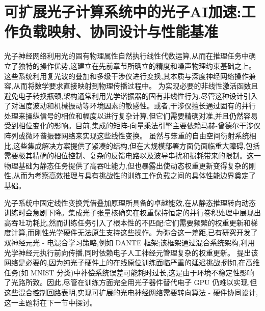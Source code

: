 \documentclass[11pt]{article}
\begin{document}
\section{可扩展光子计算系统中的光子AI加速:工作负载映射、协同设计与性能基准}\label{ux53efux6269ux5c55ux5149ux5b50ux8ba1ux7b97ux7cfbux7edfux4e2dux7684ux5149ux5b50aiux52a0ux901fux5de5ux4f5cux8d1fux8f7dux6620ux5c04ux534fux540cux8bbeux8ba1ux4e0eux6027ux80fdux57faux51c6}

光子神经网络利用光的固有物理属性自然执行线性代数运算,从而在推理任务中确立了独特的操作优势,这建立在先前章节所确立的精度和噪声物理约束基础之上。这些系统利用复光波的叠加和多级干涉仪进行变换,其本质与深度神经网络操作兼容,从而将数学要求直接映射到物理传播过程中。\citep{doi_10_1007_s11075_025_02218_2_e396aae0} \citep{doi_10_48550_arxiv_2510_03186_c4d4955e} 为实现必要的非线性激活函数且避免电子转换瓶颈,架构通常利用光学谐振器的固有非线性行为,尽管这种设计引入了对温度波动和机械振动等环境因素的敏感性。或者,干涉仪擅长通过固有的并行处理来操纵信号的相位和幅度以进行复杂计算,但它们需要精确对准,并且仍然容易受到相位变化的影响。目前,集成的矩阵-向量乘法引擎主要依赖马赫-曾德尔干涉仪阵列或微环谐振器网络来实现这些线性变换。\citep{doi_10_1117_12_2690776_82e594d2} \citep{doi_10_54254_2753_8818_2026_33628_f99a21e9} 虽然与笨重的自由空间衍射系统相比,这些集成解决方案提供了紧凑的结构,但在大规模部署方面仍面临重大障碍,包括需要极其精确的相位控制、复杂的反馈电路以及波导串扰和损耗带来的限制。这一物理基础为静态任务提供了高吞吐能力,但也暴露出使动态权重更新变得复杂的刚性,从而为考察高效推理与具有挑战性的训练工作负载之间的具体性能边界奠定了基础。\citep{doi_10_3390_nano14080697_c372a140} \citep{s2_b765388f3cc18d6e5a0507522822def0e3503ec6_fa09b483} \citep{doi_10_1088_1402_4896_ae8345_3b948559}

光子系统中固定线性变换凭借叠加原理所具备的卓越能效,在从静态推理转向动态训练时会急剧下降。集成光子张量核确实在权重保持恒定的并行卷积处理中展现出高吞吐功耗比,然而训练任务引入了根本性的不匹配:它们需要频繁的权重更新和梯度计算,而刚性光学硬件无法原生支持这些操作。为弥合这一差距,已有研究开发了双神经元光 - 电混合学习策略,例如 DANTE 框架;该框架通过混合系统架构,利用光学神经元执行前向传播,同时依赖电子人工神经元管理复杂的权重更新。\citep{doi_10_1038_s41467_023_42984_y_7fc109e3} 提出该网络是必要的,因为纯光子硬件上的在线原位训练面临严重的延迟挑战;例如,在高维任务(如 MNIST 分类)中补偿系统误差可能耗时过长,这是由于环境不稳定性影响了光路所致。因此,尽管在训练方面完全用光子器件替代电子 GPU 仍难以实现,但这些混合控制回路表明,实现可扩展的光电神经网络需要转向算法 - 硬件协同设计,这一主题将在下一节中探讨。\citep{doi_10_1515_nanoph_2022_0423_38a2c3ec} \citep{doi_10_1038_s41467_023_42984_y_7fc109e3} \citep{doi_10_1038_s41467_022_35772_7_90150ade}
\end{document}
